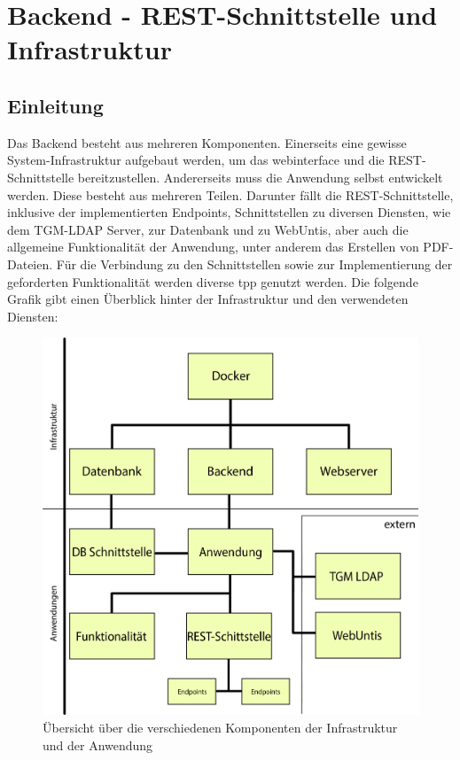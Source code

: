 
\section{Backend - REST-Schnittstelle und Infrastruktur}
	\subsection{Einleitung}
	Das Backend besteht aus mehreren Komponenten. Einerseits eine gewisse System-Infrastruktur aufgebaut werden, um das \gls{webinterface} und die REST-Schnittstelle bereitzustellen. Andererseits muss die Anwendung selbst entwickelt werden. Diese besteht aus mehreren Teilen. Darunter fällt die REST-Schnittstelle, inklusive der implementierten Endpoints, Schnittstellen zu diversen Diensten, wie dem TGM-LDAP Server, zur Datenbank und zu WebUntis, aber auch die allgemeine Funktionalität der Anwendung, unter anderem das Erstellen von PDF-Dateien. Für die Verbindung zu den Schnittstellen sowie zur Implementierung der geforderten Funktionalität werden diverse  \gls{tpp} genutzt werden. Die folgende Grafik gibt einen Überblick hinter der Infrastruktur und den verwendeten Diensten:
	\begin{figure}[H]
		\centering
		\includegraphics[width=0.8\linewidth]{images/uebersicht}
		\caption[Übersicht über die Komponenten]{Übersicht über die verschiedenen Komponenten der Infrastruktur und der Anwendung}
		\label{fig:uebersicht}
	\end{figure}
	

